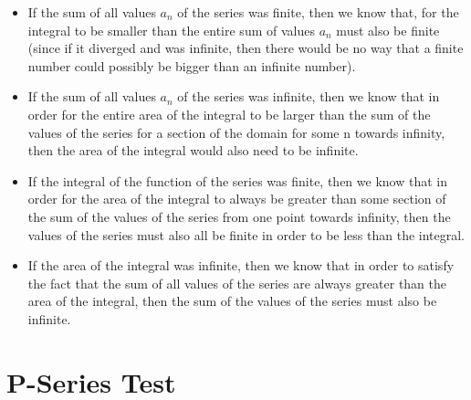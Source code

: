 \documentclass{report}
\begin{document}
\begin{sloppypar}
\begin{itemize}
  \item If the sum of all values $ a_{n}$
        of the series was finite,
        then we know that, for the integral
        to be smaller than the entire sum of
        values $a_{n}$ must also be finite
        (since if it diverged and was infinite,
        then there would be no way that a finite
        number could possibly be bigger than an
        infinite number).
  \item If the sum of all values $ a_{n}$
        of the series was infinite, then we know
        that in order for the entire area of the
        integral to be larger than the
        sum of the values of the series for
        a section of the domain for some n
         towards infinity, then the
        area of the integral would also need
        to be infinite.
  \item If the integral of the function of the
        series was finite, then we know
        that in order for the area of the integral
        to always be greater than some section
        of the sum of the values of the series
        from one point towards infinity, then
        the values of the series must also
        all be finite in order to be less than
        the integral.
  \item If the area of the integral was infinite,
        then we know that in order to satisfy
        the fact that the sum of all
        values of the series are always
        greater than the area of the integral,
        then the sum of the values of the
        series must also be infinite.
\end{itemize}

\section{P-Series Test}

\end{sloppypar}
\end{document}
